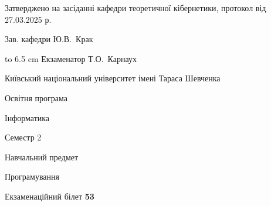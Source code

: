\documentclass[12pt, ukrainian]{article}
\begin{document}
{\smallskip\smallskip \begin {scriptsize} Затверджено на засіданні кафедри теоретичної кібернетики, протокол   від   27.03.2025 р.\par\smallskip\smallskip\smallskip\smallskip
{\parbox {6.5 cm} {Зав. кафедри \dotfill Ю.В.~Крак}}\hspace {0.7cm} {\hbox to 6.5 cm { Екзаменатор \dotfill Т.О.~Карнаух}} \end{scriptsize}}
\newpage
{{\begin {scriptsize}\par
{ \center  Київський національний університет імені Тараса Шевченка \par}
{\parbox {5 cm}{Освітня програма \hfill}{\parbox {7 cm}{Інформатика\hfill}}\parbox {6 cm}{\hfill Семестр 2}}\par
{\parbox {5 cm} {Навчальний предмет \hfill}\parbox {7 cm}{Програмування \hfill}\parbox {6cm}{\hfill}\par}\vspace{-15pt} \end{scriptsize}}{\center Екзаменаційний білет \No \textbf { 53 }\par}}
\end{document}
